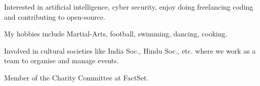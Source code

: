 

\begin{cventries}
	
    
	\cventry
	{}
    {}
    {}
    {}
	{
    \vspace{-4.0mm}
	\begin{cvitems} %
    	\item {Interested in artificial intelligence, cyber security, enjoy doing freelancing coding and contributing to open-source.}
    	\item {My hobbies include Martial-Arts, football, swimming, dancing, cooking.}
    	\item {Involved in cultural societies like India Soc., Hindu Soc., etc. where we work as a team to organise and manage events.}
    	\item {Member of the Charity Committee at FactSet.}
	\end{cvitems}
	}
	
\end{cventries}